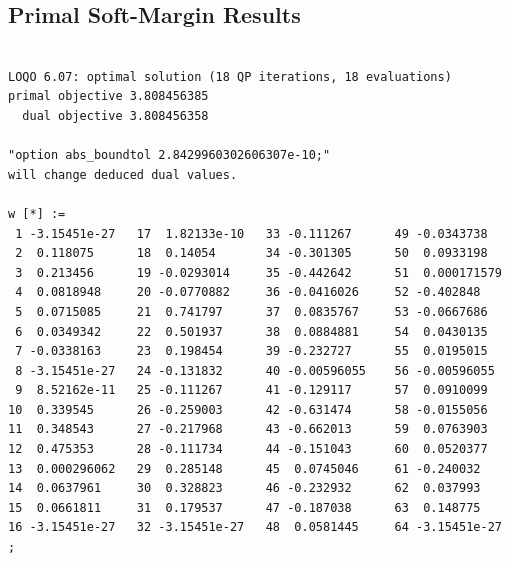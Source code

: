 \documentclass{article}
\begin{document}
\subsection{Primal Soft-Margin Results}

\begin{verbatim}

LOQO 6.07: optimal solution (18 QP iterations, 18 evaluations)
primal objective 3.808456385
  dual objective 3.808456358

"option abs_boundtol 2.8429960302606307e-10;"
will change deduced dual values.

w [*] :=
 1 -3.15451e-27   17  1.82133e-10   33 -0.111267      49 -0.0343738
 2  0.118075      18  0.14054       34 -0.301305      50  0.0933198
 3  0.213456      19 -0.0293014     35 -0.442642      51  0.000171579
 4  0.0818948     20 -0.0770882     36 -0.0416026     52 -0.402848
 5  0.0715085     21  0.741797      37  0.0835767     53 -0.0667686
 6  0.0349342     22  0.501937      38  0.0884881     54  0.0430135
 7 -0.0338163     23  0.198454      39 -0.232727      55  0.0195015
 8 -3.15451e-27   24 -0.131832      40 -0.00596055    56 -0.00596055
 9  8.52162e-11   25 -0.111267      41 -0.129117      57  0.0910099
10  0.339545      26 -0.259003      42 -0.631474      58 -0.0155056
11  0.348543      27 -0.217968      43 -0.662013      59  0.0763903
12  0.475353      28 -0.111734      44 -0.151043      60  0.0520377
13  0.000296062   29  0.285148      45  0.0745046     61 -0.240032
14  0.0637961     30  0.328823      46 -0.232932      62  0.037993
15  0.0661811     31  0.179537      47 -0.187038      63  0.148775
16 -3.15451e-27   32 -3.15451e-27   48  0.0581445     64 -3.15451e-27
;


\end{verbatim}
\end{document}
